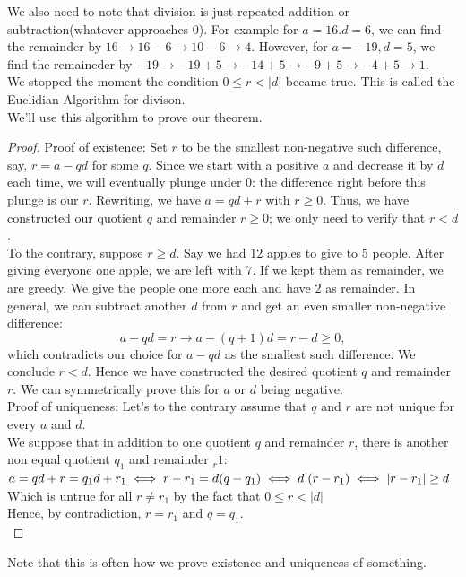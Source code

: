 We also need to note that division is just repeated addition or subtraction(whatever approaches 0). For example for $a=16. d=6$, we can find the remainder by $16 \to 16-6 \to 10-6 \to 4$. However, for $a=-19, d=5$, we find the remaineder by $-19 \to -19+5 \to -14+5 \to -9+5 \to -4+5 \to 1$.\\
We stopped the moment the condition $0 \leq r <|d|$ became true. This is called the Euclidian Algorithm for divison.\\
We'll use this algorithm to prove our theorem.\\
\begin{proof}
Proof of existence: Set $r$ to be the smallest non-negative such difference, say, $r = a - qd$ for some $q$. Since we start with a positive $a$ and decrease it by $d$ each time, we will eventually plunge under $0$: the difference right before this plunge is our $r$. Rewriting, we have $a = qd + r$ with $r \geq 0$. Thus, we have constructed our quotient $q$ and remainder $r \geq 0$; we only need to verify that $r < d$.\\
To the contrary, suppose $r \geq d$. Say we had $12$ apples to give to $5$ people. After giving everyone one apple, we are left with $7$. If we kept them as remainder, we are greedy. We give the people one more each and have $2$ as remainder. In general, we can subtract another $d$ from $r$ and get an even smaller non-negative difference: 
\[a - qd = r \rightarrow a - (q + 1)d = r - d \geq 0,\]
which contradicts our choice for $a - qd$ as the smallest such difference. We conclude $r < d$. Hence we have constructed the desired quotient $q$ and remainder $r$. We can symmetrically prove this for $a$ or $d$ being negative.\\
Proof of uniqueness: Let's to the contrary assume that $q$ and $r$ are not unique for every $a$ and $d$.\\
We suppose that in addition to one quotient $q$ and remainder $r$, there is another non equal quotient $q_1$ and remainder $_r1$:
$a = qd + r = q_1d + r_1\\
\iff r-r_1=d(q-q_1)\\
\iff d|(r-r_1)\\
\iff |r-r_1| \geq d$\\
Which is untrue for all $r \neq r_1$ by the fact that $0 \leq r < |d|$\\
Hence, by contradiction, $r=r_1$ and $q=q_1$.\\
\end{proof}
Note that this is often how we prove existence and uniqueness of something.\\
